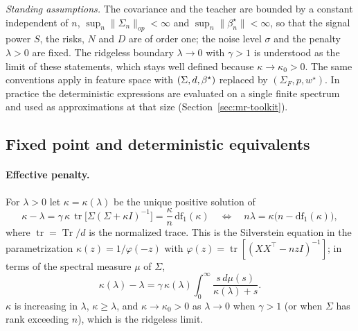 {{\emph{Standing assumptions.}  The covariance and the teacher are bounded by a
constant independent of $n$, $\sup_n\|\Sigma_n\|_{op}<\infty$ and
$\sup_n\|\beta^{\star}_n\|<\infty$, so that the signal power $S$, the risks,
$N$ and $D$ are of order one; the noise level $\sigma$ and the penalty
$\lambda>0$ are fixed.  The ridgeless boundary $\lambda\to0$ with $\gamma>1$
is understood as the limit of these statements, which stays well defined
because $\kappa\to\kappa_0>0$.  The same conventions apply in feature space
with $(\Sigma,d,{\beta^{\star}})$ replaced by $(\Sigma_F,p,w^\star)$.  In practice the
deterministic expressions are evaluated on a single finite spectrum and used
as approximations at that size (Section~\ref{sec:mr-toolkit}).}

\subsection{Fixed point and deterministic equivalents}
\label{sec:app-de-identities}

\paragraph{Effective penalty.}
For $\lambda>0$ let $\kappa=\kappa(\lambda)$ be the unique positive solution
of
\begin{equation}
\kappa-\lambda=\gamma\,\kappa\,\operatorname{tr}\big[\Sigma(\Sigma+\kappa I)^{-1}\big]
=\frac{\kappa}{n}\,\mathrm{df}_1(\kappa)
\quad\Longleftrightarrow\quad
n\lambda=\kappa\big(n-\mathrm{df}_1(\kappa)\big),
\label{eq:app-kappa-fixed-point}
\end{equation}
where $\operatorname{tr}=\operatorname{Tr}/d$ is the normalized trace.  This
is the Silverstein equation in the parametrization
$\kappa(z)=1/\varphi(-z)$ with $\varphi(z)=\operatorname{tr}[(XX^\top-nzI)^{-1}]$;
in terms of the spectral measure $\mu$ of $\Sigma$,
\begin{equation}
\kappa(\lambda)-\lambda=\gamma\,\kappa(\lambda)\int_0^\infty\frac{s\,d\mu(s)}{\kappa(\lambda)+s}.
\label{eq:silverstein_self_consistent}
\end{equation}
$\kappa$ is increasing in $\lambda$, $\kappa\ge\lambda$, and $\kappa\to\kappa_0>0$
as $\lambda\to0$ when $\gamma>1$ (or when $\Sigma$ has rank exceeding $n$),
which is the ridgeless limit.

}
